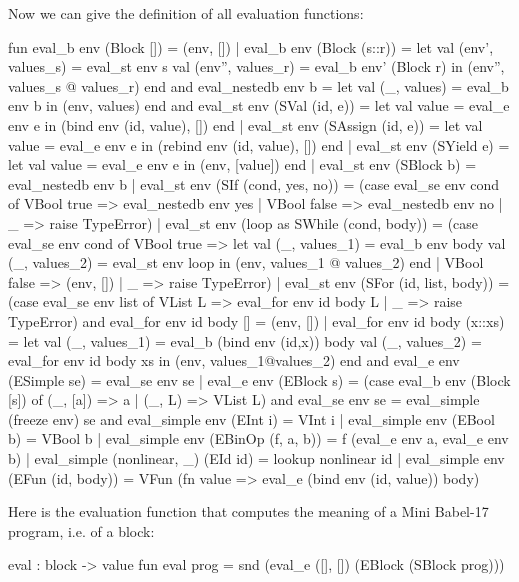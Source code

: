 \documentclass{llncs}
\begin{document}
Now we can give the definition of all evaluation functions:
\begin{babellisting}
fun eval_b env (Block []) = (env, [])
  | eval_b env (Block (s::r)) =
    let
      val (env', values_s) = eval_st env s
      val (env'', values_r) = eval_b env' (Block r)
    in (env'', values_s @ values_r) end
and eval_nestedb env b =
    let
      val (_, values) = eval_b env b
    in (env, values) end
and eval_st env (SVal (id, e)) =
    let
      val value = eval_e env e
    in (bind env (id, value), []) end
  | eval_st env (SAssign (id, e)) =
    let
      val value = eval_e env e
    in (rebind env (id, value), []) end
  | eval_st env (SYield e) =
    let
      val value = eval_e env e
    in (env, [value]) end
  | eval_st env (SBlock b) = eval_nestedb env b
  | eval_st env (SIf (cond, yes, no)) =
      (case eval_se env cond of
        VBool true => eval_nestedb env yes
      | VBool false => eval_nestedb env no
      | _ => raise TypeError)
  | eval_st env (loop as SWhile (cond, body)) =
      (case eval_se env cond of
        VBool true =>
          let
            val (_, values_1) = eval_b env body
            val (_, values_2) = eval_st env loop
          in (env, values_1 @ values_2) end
      | VBool false =>
          (env, [])
      | _ => raise TypeError)
  | eval_st env (SFor (id, list, body)) =
      (case eval_se env list of
         VList L => eval_for env id body L
       | _ => raise TypeError)
and eval_for env id body [] = (env, [])
  | eval_for env id body (x::xs) =
    let
      val (_, values_1) = eval_b (bind env (id,x)) body
      val (_, values_2) = eval_for env id body xs
    in (env, values_1@values_2) end
and eval_e env (ESimple se) = eval_se env se
  | eval_e env (EBlock s) =
      (case eval_b env (Block [s]) of
         (_, [a]) => a
       | (_, L) => VList L)
and eval_se env se = eval_simple (freeze env) se
and eval_simple env (EInt i) = VInt i
  | eval_simple env (EBool b) = VBool b
  | eval_simple env (EBinOp (f, a, b)) =
      f (eval_e env a, eval_e env b)
  | eval_simple (nonlinear, _) (EId id) = 
      lookup nonlinear id
  | eval_simple env (EFun (id, body)) =
      VFun (fn value =>
              eval_e (bind env (id, value)) body)
\end{babellisting}
Here is the evaluation function that computes the meaning of a Mini Babel-17 program, i.e. of a block:
\begin{babellisting}
eval : block -> value
fun eval prog = snd (eval_e ([], []) (EBlock (SBlock prog)))
\end{babellisting}
\end{document}
